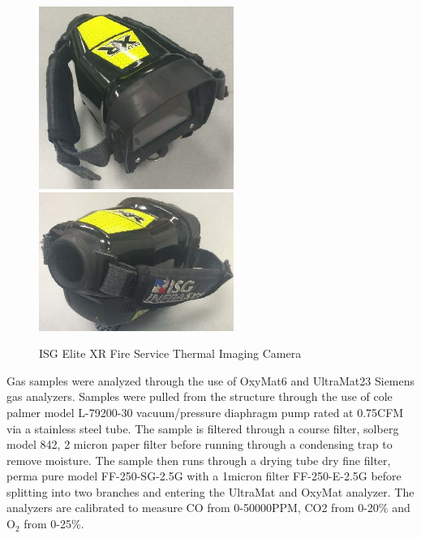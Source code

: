 \documentclass{article}
\begin{document}
\begin{figure} [H]
	\centering
	\includegraphics[width = 2.5in]{0_Images/Instrumentation/ISG_IR.jpg}
	\includegraphics[width = 2.5in]{0_Images/Instrumentation/ISG_IR2.jpg}
	\caption{ISG Elite XR Fire Service Thermal Imaging Camera}
	\label{fig:IRCam}
\end{figure}

Gas samples were analyzed through the use of OxyMat6 and UltraMat23 Siemens gas analyzers. Samples were pulled from the structure through the use of cole palmer model L-79200-30 vacuum/pressure diaphragm pump rated at 0.75CFM via a stainless steel tube. The sample is filtered through a course filter, solberg model 842, 2 micron paper filter before running through a condensing trap to remove moisture. The sample then runs through a drying tube dry fine filter, perma pure model FF-250-SG-2.5G with a 1micron filter FF-250-E-2.5G before splitting into two branches and entering the UltraMat and OxyMat analyzer. The analyzers are calibrated to measure CO from 0-50000PPM, CO2 from 0-20\% and O$_2$ from 0-25\%. 
\end{document}

